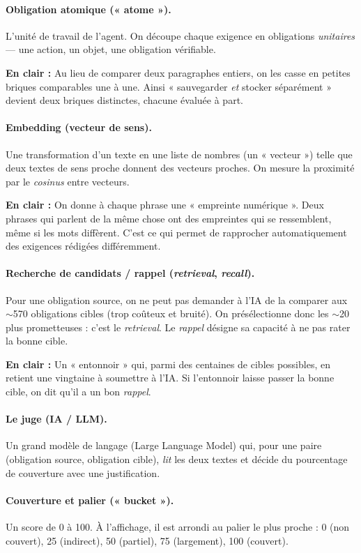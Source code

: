 \documentclass[11pt,a4paper]{report}
\newcommand{\enclair}[1]{\begin{plain}\textbf{En clair :} #1\end{plain}}
\begin{document}
\paragraph{Obligation atomique (« atome »).} L'unité de travail de l'agent. On découpe chaque exigence en obligations \emph{unitaires} — une action, un objet, une obligation vérifiable.
\enclair{Au lieu de comparer deux paragraphes entiers, on les casse en petites briques comparables une à une. Ainsi « sauvegarder \emph{et} stocker séparément » devient deux briques distinctes, chacune évaluée à part.}

\paragraph{Embedding (vecteur de sens).} Une transformation d'un texte en une liste de nombres (un « vecteur ») telle que deux textes de sens proche donnent des vecteurs proches. On mesure la proximité par le \emph{cosinus} entre vecteurs.
\enclair{On donne à chaque phrase une « empreinte numérique ». Deux phrases qui parlent de la même chose ont des empreintes qui se ressemblent, même si les mots diffèrent. C'est ce qui permet de rapprocher automatiquement des exigences rédigées différemment.}

\paragraph{Recherche de candidats / rappel (\emph{retrieval}, \emph{recall}).} Pour une obligation source, on ne peut pas demander à l'IA de la comparer aux $\sim$570 obligations cibles (trop coûteux et bruité). On présélectionne donc les $\sim$20 plus prometteuses : c'est le \emph{retrieval}. Le \emph{rappel} désigne sa capacité à ne pas rater la bonne cible.
\enclair{Un « entonnoir » qui, parmi des centaines de cibles possibles, en retient une vingtaine à soumettre à l'IA. Si l'entonnoir laisse passer la bonne cible, on dit qu'il a un bon \emph{rappel}.}

\paragraph{Le juge (IA / LLM).} Un grand modèle de langage (Large Language Model) qui, pour une paire (obligation source, obligation cible), \emph{lit} les deux textes et décide du pourcentage de couverture avec une justification.

\paragraph{Couverture et palier (« bucket »).} Un score de 0 à 100. À l'affichage, il est arrondi au palier le plus proche : 0 (non couvert), 25 (indirect), 50 (partiel), 75 (largement), 100 (couvert).
\end{document}

